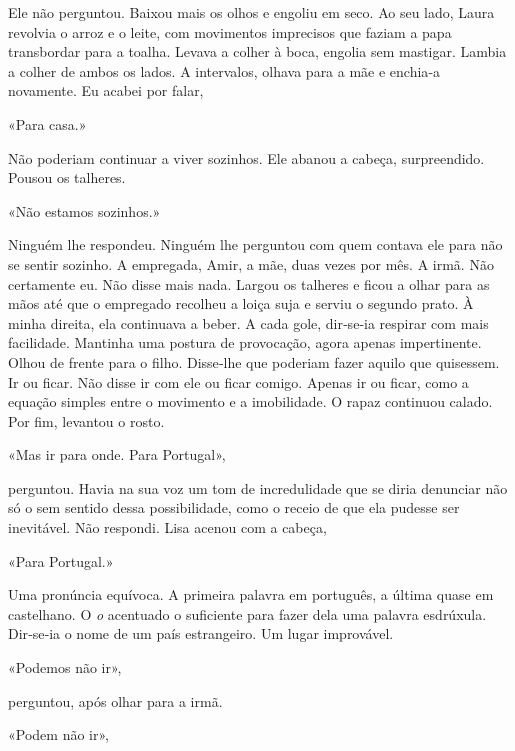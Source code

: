 Ele não perguntou. Baixou mais os olhos e engoliu em seco. Ao seu lado,
Laura revolvia o arroz e o leite, com movimentos imprecisos que faziam a
papa transbordar para a toalha. Levava a colher à boca, engolia sem
mastigar. Lambia a colher de ambos os lados. A intervalos, olhava para a
mãe e enchia­‑a novamente. Eu acabei por falar,

«Para casa.»

Não poderiam continuar a viver sozinhos. Ele abanou a cabeça,
surpreendido. Pousou os talheres.

«Não estamos sozinhos.»

Ninguém lhe respondeu. Ninguém lhe perguntou com quem contava ele para
não se sentir sozinho. A empregada, Amir, a mãe, duas vezes por mês. A
irmã. Não certamente eu. Não disse mais nada. Largou os talheres e ficou
a olhar para as mãos até que o empregado recolheu a loiça suja e serviu
o segundo prato. À minha direita, ela continuava a beber. A cada gole,
dir­‑se­‑ia respirar com mais facilidade. Mantinha uma postura de
provocação, agora apenas impertinente. Olhou de frente para o filho.
Disse­‑lhe que poderiam fazer aquilo que quisessem. Ir ou ficar. Não
disse ir com ele ou ficar comigo. Apenas ir ou ficar, como a equação
simples entre o movimento e a imobilidade. O rapaz continuou calado. Por
fim, levantou o rosto.

«Mas ir para onde. Para Portugal»,

perguntou. Havia na sua voz um tom de incredulidade que se diria
denunciar não só o sem sentido dessa possibilidade, como o receio de que
ela pudesse ser inevitável. Não respondi. Lisa acenou com a cabeça,

«Para Portugal.»

Uma pronúncia equívoca. A primeira palavra em português, a última quase
em castelhano. O \emph{o} acentuado o suficiente para fazer dela uma
palavra esdrúxula. Dir­‑se­‑ia o nome de um país estrangeiro. Um lugar
improvável.

«Podemos não ir»,

perguntou, após olhar para a irmã.

«Podem não ir»,

